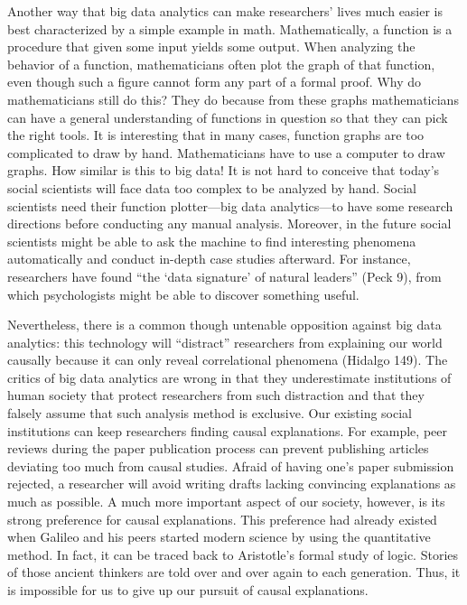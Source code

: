\documentclass{writing}
\begin{document}
Another way that big data analytics can make researchers' lives much
easier is best characterized by a simple example in math.
Mathematically, a function is a procedure that given some input yields
some output. When analyzing the behavior of a function, mathematicians
often plot the graph of that function, even though such a figure cannot
form any part of a formal proof. Why do mathematicians still do this?
They do because from these graphs mathematicians can have a general
understanding of functions in question so that they can pick the right
tools. It is interesting that in many cases, function graphs are too
complicated to draw by hand. Mathematicians have to use a computer to
draw graphs. How similar is this to big data! It is not hard to conceive
that today's social scientists will face data too complex to be analyzed
by hand. Social scientists need their function plotter---big data
analytics---to have some research directions before conducting any
manual analysis. Moreover, in the future social scientists might be able
to ask the machine to find interesting phenomena automatically and
conduct in-depth case studies afterward. For instance, researchers have
found ``the `data signature' of natural leaders'' (Peck 9), from which
psychologists might be able to discover something useful.

Nevertheless, there is a common though untenable opposition against big
data analytics: this technology will ``distract'' researchers from
explaining our world causally because it can only reveal correlational
phenomena (Hidalgo 149). The critics of big data analytics are wrong in
that they underestimate institutions of human society that protect
researchers from such distraction and that they falsely assume that such
analysis method is exclusive. Our existing social institutions can keep
researchers finding causal explanations. For example, peer reviews
during the paper publication process can prevent publishing articles
deviating too much from causal studies. Afraid of having one's paper
submission rejected, a researcher will avoid writing drafts lacking
convincing explanations as much as possible. A much more important
aspect of our society, however, is its strong preference for causal
explanations. This preference had already existed when Galileo and his
peers started modern science by using the quantitative method. In fact,
it can be traced back to Aristotle's formal study of logic. Stories of
those ancient thinkers are told over and over again to each generation.
Thus, it is impossible for us to give up our pursuit of causal
explanations.
\end{document}
